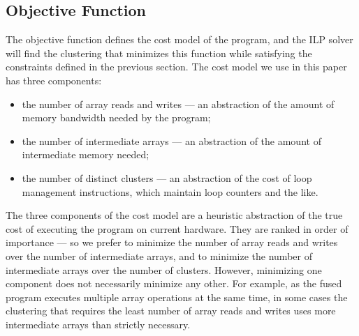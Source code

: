 \subsection{Objective Function}
\label{s:ObjectiveFunction}
The objective function defines the cost model of the program, and the ILP solver will find the clustering that minimizes this function while satisfying the constraints defined in the previous section. The cost model we use in this paper has three components:
\begin{itemize}
\item
the number of array reads and writes --- an abstraction of the amount of memory bandwidth needed by the program; 
\item
the number of intermediate arrays --- an abstraction of the amount of intermediate memory needed; 
\item
the number of distinct clusters --- an abstraction of the cost of loop management instructions, which maintain loop counters and the like.
\end{itemize}
The three components of the cost model are a heuristic abstraction of the true cost of executing the program on current hardware. They are ranked in order of importance --- so we prefer to minimize the number of array reads and writes over the number of intermediate arrays, and to minimize the number of intermediate arrays over the number of clusters. However, minimizing one component does not necessarily minimize any other. For example, as the fused program executes multiple array operations at the same time, in some cases the clustering that requires the least number of array reads and writes uses more intermediate arrays than strictly necessary.

